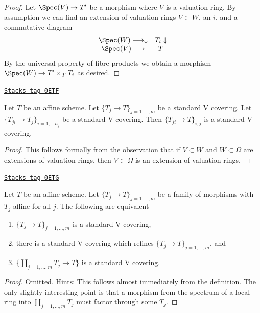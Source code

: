 \begin{proof}
Let $\Spec(V) \to T'$ be a morphism where $V$ is a valuation ring.
By assumption we can find an extension of valuation rings $V \subset W$,
an $i$, and a commutative diagram
$$
\begin{array}{cc}\Spec(W) \longrightarrow\downarrow & T_i \downarrow \\ \Spec(V) \longrightarrow & T\end{array}
$$
By the universal property of fibre products
we obtain a morphism $\Spec(W) \to T' \times_T T_i$
as desired.
\end{proof}

\begin{lemma}
\label{topologies-lemma-composition-standard-V}
\href{https://stacks.math.columbia.edu/tag/0ETF}{\texttt{Stacks tag 0ETF}}

Let $T$ be an affine scheme. Let $\{T_j \to T\}_{j = 1, \ldots, m}$
be a standard V covering. Let $\{T_{ji} \to T_j\}_{i = 1, \ldots n_j}$
be a standard V covering. Then $\{T_{ji} \to T\}_{i, j}$
is a standard V covering.
\end{lemma}

\begin{proof}
This follows formally from the observation that if
$V \subset W$ and $W \subset \Omega$ are extensions of
valuation rings, then $V \subset \Omega$ is an extension
of valuation rings.
\end{proof}

\begin{lemma}
\label{topologies-lemma-refine-standard-V}
\href{https://stacks.math.columbia.edu/tag/0ETG}{\texttt{Stacks tag 0ETG}}

Let $T$ be an affine scheme. Let $\{T_j \to T\}_{j = 1, \ldots, m}$
be a family of morphisms with $T_j$ affine for all $j$.
The following are equivalent
\begin{enumerate}
\item $\{T_j \to T\}_{j = 1, \ldots, m}$ is a standard V covering,
\item there is a standard V covering which refines
$\{T_j \to T\}_{j = 1, \ldots, m}$, and
\item $\{\coprod_{j = 1, \ldots, m} T_j \to T\}$ is a standard
V covering.
\end{enumerate}
\end{lemma}

\begin{proof}
Omitted. Hints: This follows almost immediately from the definition.
The only slightly interesting point is that
a morphism from the spectrum of a local ring into
$\coprod_{j = 1, \ldots, m} T_j$ must factor through some $T_j$.
\end{proof}

